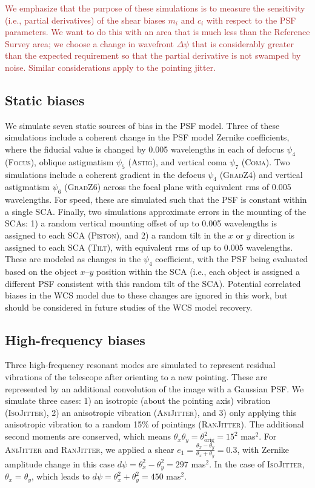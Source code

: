 \documentclass[usenatbib]{mnras}
\newcommand{\changetext}[1]{\textcolor{brown}{#1}}
\begin{document}
\changetext{We emphasize that the purpose of these simulations is to measure the sensitivity (i.e., partial derivatives) of the shear biases $m_i$ and $c_i$ with respect to the PSF parameters. We want to do this with an area that is much less than the Reference Survey area; we choose a change in wavefront $\Delta\psi$ that is considerably greater than the expected requirement so that the partial derivative is not swamped by noise. Similar considerations apply to the pointing jitter.}

\subsection{Static biases}\label{sec:static}

We simulate seven static sources of bias in the PSF model. 
Three of these simulations include a coherent change in the PSF model Zernike coefficients, where the fiducial value is changed by 0.005 wavelengths in each of defocus $\psi_4$ (\textsc{Focus}), oblique astigmatism $\psi_5$ (\textsc{Astig}), and vertical coma $\psi_7$ (\textsc{Coma}). 
Two simulations include a coherent gradient in the defocus $\psi_4$ (\textsc{GradZ4}) and vertical astigmatism $\psi_6$ (\textsc{GradZ6}) across the focal plane with equivalent rms of 0.005 wavelengths. 
For speed, these are simulated such that the PSF is constant within a single SCA. Finally, two simulations approximate errors in the mounting of the SCAs: 1) a random vertical mounting offset of up to 0.005 wavelengths is assigned to each SCA (\textsc{Piston}), and 2) a random tilt in the $x$ or $y$ direction is assigned to each SCA  (\textsc{Tilt}), with equivalent rms of up to 0.005 wavelengths. 
These are modeled as changes in the $\psi_4$ coefficient, with the PSF being evaluated based on the object $x$--$y$ position within the SCA (i.e., each object is assigned a different PSF consistent with this random tilt of the SCA). 
Potential correlated biases in the WCS model due to these changes are ignored in this work, but should be considered in future studies of the WCS model recovery.

\subsection{High-frequency biases}\label{sec:low}

Three high-frequency resonant modes are simulated to represent residual vibrations of the telescope after orienting to a new pointing. 
These are represented by an additional convolution of the image with a Gaussian PSF. We simulate three cases: 1) an isotropic (about the pointing axis) vibration  (\textsc{IsoJitter}), 2) an anisotropic vibration (\textsc{AniJitter}), and 3) only applying this anisotropic vibration to a random 15\% of pointings (\textsc{RanJitter}). 
The additional second moments are conserved, which means $\theta_x\theta_y=\theta_{\mathrm{orig}}^2=15^2$ mas$^2$. 
For \textsc{AniJitter} and \textsc{RanJitter}, we applied a shear $e_1=\frac{\theta_x-\theta_y}{\theta_x+\theta_y}=0.3$,  with Zernike amplitude change in this case  $d\psi=\theta_x^2-\theta_y^2=297$ mas$^2$. 
In the case of \textsc{IsoJitter}, $\theta_x=\theta_y$, which leads to $d\psi=\theta_x^2+\theta_y^2=450$ mas$^2$.
\end{document}
